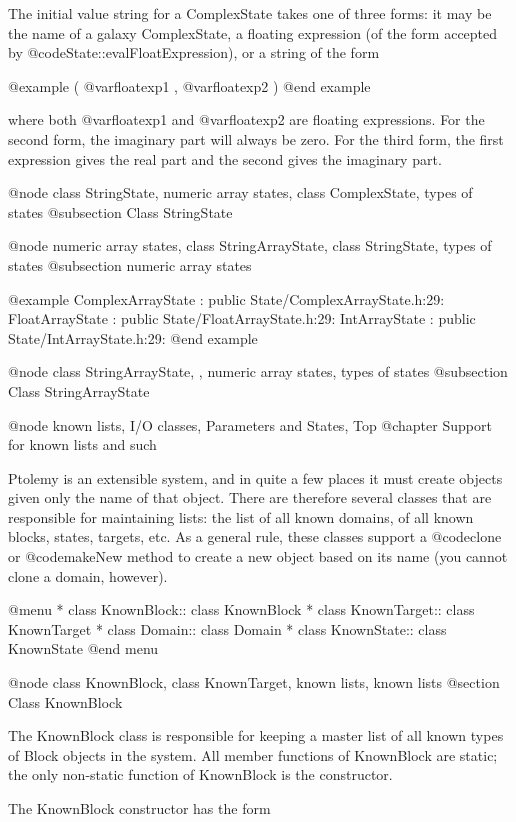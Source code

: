 The initial value string for a ComplexState takes one of three forms:
it may be the name of a galaxy ComplexState, a floating expression
(of the form accepted by @code{State::evalFloatExpression}), or a
string of the form

@example
( @var{floatexp1} , @var{floatexp2} )
@end example

where both @var{floatexp1} and @var{floatexp2} are floating expressions.
For the second form, the imaginary part will always be zero.  For the
third form, the first expression gives the real part and the second
gives the imaginary part.

@node class StringState, numeric array states, class ComplexState, types of states
@subsection Class StringState

@node numeric array states, class StringArrayState, class StringState, types of states
@subsection numeric array states

@example
ComplexArrayState : public State/ComplexArrayState.h:29:
FloatArrayState : public State/FloatArrayState.h:29:
IntArrayState : public State/IntArrayState.h:29:
@end example

@node class StringArrayState,  , numeric array states, types of states
@subsection Class StringArrayState

@node known lists, I/O classes, Parameters and States, Top
@chapter Support for known lists and such

Ptolemy is an extensible system, and in quite a few places it must
create objects given only the name of that object.  There are therefore
several classes that are responsible for maintaining lists: the list of
all known domains, of all known blocks, states, targets, etc.  As a
general rule, these classes support a @code{clone} or @code{makeNew}
method to create a new object based on its name (you cannot clone a
domain, however).

@menu
* class KnownBlock::            class KnownBlock
* class KnownTarget::           class KnownTarget
* class Domain::                class Domain
* class KnownState::            class KnownState
@end menu

@node class KnownBlock, class KnownTarget, known lists, known lists
@section Class KnownBlock

The KnownBlock class is responsible for keeping a master list of all
known types of Block objects in the system.  All member functions of
KnownBlock are static; the only non-static function of KnownBlock is
the constructor.

The KnownBlock constructor has the form

